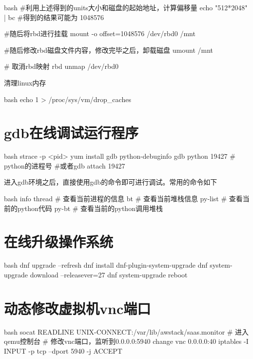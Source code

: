 \begin{outline}[enumerate]
\begin{code-in-enumerate}{bash}
#利用上述得到的units大小和磁盘的起始地址，计算偏移量
echo "512*2048" | bc
#得到的结果可能为 1048576

#随后将rbd进行挂载
mount -o offset=1048576 /dev/rbd0 /mnt

#随后修改rbd磁盘文件内容，修改完毕之后，卸载磁盘
umount /mnt

# 取消rbd映射
rbd unmap /dev/rbd0
\end{code-in-enumerate}

\1 清理linux内存
\begin{code-in-enumerate}{bash}
echo 1 > /proc/sys/vm/drop_caches
\end{code-in-enumerate}

\end{outline}

\section{gdb在线调试运行程序}
\begin{code-block}{bash}
strace -p <pid>
yum install gdb python-debuginfo
gdb python 19427 # python的进程号
#或者gdb attach 19427
\end{code-block}

进入gdb环境之后，直接使用gdb的命令即可进行调试。常用的命令如下
\begin{code-block}{bash}
info thread # 查看当前进程的信息
bt          # 查看当前堆栈信息
py-list     # 查看当前的python代码
py-bt       # 查看当前的python调用堆栈
\end{code-block}

\section{在线升级操作系统}
\begin{code-block}{bash}
dnf upgrade --refresh
dnf install dnf-plugin-system-upgrade
dnf system-upgrade download --releasever=27
dnf system-upgrade reboot
\end{code-block}

\section{动态修改虚拟机vnc端口}
\begin{code-block}{bash}
socat READLINE UNIX-CONNECT:/var/lib/awstack/saas.monitor
# 进入qemu控制台
# 修改vnc端口，监听到0.0.0.0:5940
change vnc 0.0.0.0:40
iptables -I INPUT -p tcp --dport 5940 -j ACCEPT
\end{code-block}

